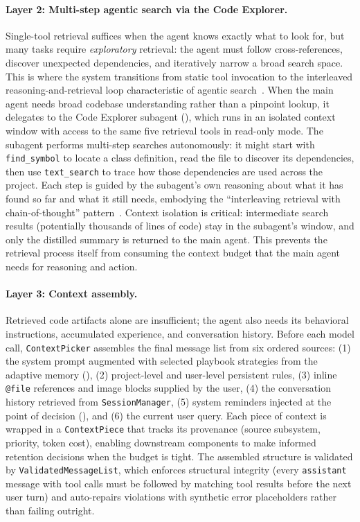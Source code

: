 \paragraph{Layer 2: Multi-step agentic search via the Code Explorer.}
Single-tool retrieval suffices when the agent knows exactly what to look for, but many tasks require \emph{exploratory} retrieval: the agent must follow cross-references, discover unexpected dependencies, and iteratively narrow a broad search space. This is where the system transitions from static tool invocation to the interleaved reasoning-and-retrieval loop characteristic of agentic search~\cite{yao2023react, trivedi2022interleaving}. When the main agent needs broad codebase understanding rather than a pinpoint lookup, it delegates to the Code Explorer subagent (), which runs in an isolated context window with access to the same five retrieval tools in read-only mode. The subagent performs multi-step searches autonomously: it might start with \texttt{find\_symbol} to locate a class definition, read the file to discover its dependencies, then use \texttt{text\_search} to trace how those dependencies are used across the project. Each step is guided by the subagent's own reasoning about what it has found so far and what it still needs, embodying the ``interleaving retrieval with chain-of-thought'' pattern~\cite{trivedi2022interleaving}. Context isolation is critical: intermediate search results (potentially thousands of lines of code) stay in the subagent's window, and only the distilled summary is returned to the main agent. This prevents the retrieval process itself from consuming the context budget that the main agent needs for reasoning and action.

\paragraph{Layer 3: Context assembly.}
Retrieved code artifacts alone are insufficient; the agent also needs its behavioral instructions, accumulated experience, and conversation history. Before each model call, \texttt{ContextPicker} assembles the final message list from six ordered sources: (1) the system prompt augmented with selected playbook strategies from the adaptive memory (), (2) project-level and user-level persistent rules, (3) inline \texttt{@file} references and image blocks supplied by the user, (4) the conversation history retrieved from \texttt{SessionManager}, (5) system reminders injected at the point of decision (), and (6) the current user query. Each piece of context is wrapped in a \texttt{ContextPiece} that tracks its provenance (source subsystem, priority, token cost), enabling downstream components to make informed retention decisions when the budget is tight. The assembled structure is validated by \texttt{ValidatedMessageList}, which enforces structural integrity (every \texttt{assistant} message with tool calls must be followed by matching tool results before the next user turn) and auto-repairs violations with synthetic error placeholders rather than failing outright.


